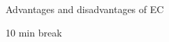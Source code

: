 \documentclass[compress]{beamer}
\makeatletter
\let\beamer@writeslidentry@miniframeson=\beamer@writeslidentry
\def\beamer@writeslidentry@miniframesoff{%
  \expandafter\beamer@ifempty\expandafter{\beamer@framestartpage}{}%
  {%
    \clearpage\beamer@notesactions%
  }
}
\newcommand*{\miniframeson}{\let\beamer@writeslidentry=\beamer@writeslidentry@miniframeson}
\newcommand*{\miniframesoff}{\let\beamer@writeslidentry=\beamer@writeslidentry@miniframesoff}
\makeatother
\begin{document}
{
\begin{frame}{Advantages and disadvantages of EC}

%
%
%
%
%

\end{frame}
}

\miniframesoff
\begin{frame}[plain]
    \begin{center}
        \Large
        10 min break\\[2em]
    \end{center}
\end{frame}
\miniframeson


\end{document}
